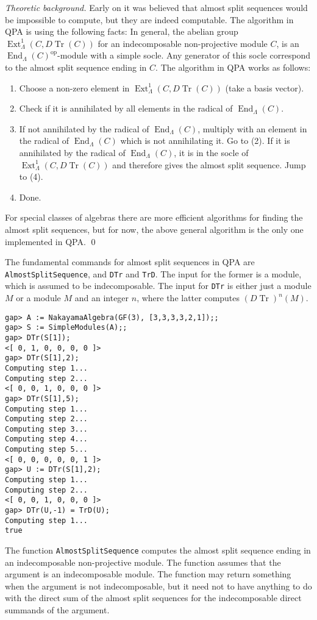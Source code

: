 \documentclass{amsart}
\newcommand{\End}{\operatorname{End}\nolimits}
\newcommand{\Tr}{\operatorname{Tr}\nolimits}
\newcommand{\Ext}{\operatorname{Ext}\nolimits}
\newcommand{\op}{{\operatorname{op}\nolimits}}
\theoremstyle{definition}
\newcommand{\code}[1]{\texttt{#1}}
\theoremstyle{theoretic}
\newenvironment{theoback}
{\medskip\small\textit{Theoretic background.} }
{\qed\par\medskip}
\begin{document}
\begin{theoback} 
Early on it was believed that almost split sequences would be
impossible to compute, but they are indeed computable.  The algorithm
in QPA is using the following facts:  In general, the abelian group
$\Ext^1_\Lambda(C,D\Tr(C))$ for an indecomposable non-projective
module $C$, is an $\End_\Lambda(C)^\op$-module with a simple socle.
Any generator of this socle correspond to the almost split sequence
ending in $C$.  The algorithm in QPA works as follows:  
\begin{enumerate}[\rm(1)]
\item Choose a non-zero element in $\Ext^1_\Lambda(C,D\Tr(C))$ (take a
  basis vector).
\item Check if it is annihilated by all elements in the radical of
  $\End_\Lambda(C)$. 
\item If not annihilated by the radical of $\End_\Lambda(C)$, multiply
  with an element in the radical of $\End_\Lambda(C)$ which is not
  annihilating it.  Go to (2).  If it is annihilated by the radical of
  $\End_\Lambda(C)$, it is in the socle of $\Ext^1_\Lambda(C,D\Tr(C))$
  and therefore gives the almost split sequence.  Jump to (4).
\item Done.
\end{enumerate}
For special classes of algebras there are more efficient algorithms
for finding the almost split sequences, but for now, the above general
algorithm is the only one implemented in QPA. 
\end{theoback} 

\sloppypar The fundamental commands for almost split sequences in QPA are
\code{AlmostSplitSequence}, and \code{DTr} and \code{TrD}.  The input
for the former is a module, which is assumed to be indecomposable.
The input for \code{DTr} is either just a module $M$ or a module $M$
and an integer $n$, where the latter computes $(D\Tr)^n(M)$.  
\begin{verbatim}
gap> A := NakayamaAlgebra(GF(3), [3,3,3,3,2,1]);;
gap> S := SimpleModules(A);;
gap> DTr(S[1]);
<[ 0, 1, 0, 0, 0, 0 ]>
gap> DTr(S[1],2);
Computing step 1...
Computing step 2...
<[ 0, 0, 1, 0, 0, 0 ]>
gap> DTr(S[1],5);
Computing step 1...
Computing step 2...
Computing step 3...
Computing step 4...
Computing step 5...
<[ 0, 0, 0, 0, 0, 1 ]>
gap> U := DTr(S[1],2);
Computing step 1...
Computing step 2...
<[ 0, 0, 1, 0, 0, 0 ]>
gap> DTr(U,-1) = TrD(U);   
Computing step 1...
true
\end{verbatim}
The function \code{AlmostSplitSequence} computes the almost split
sequence ending in an indecomposable non-projective module.  The 
function assumes that the argument is an indecomposable module.  The
function may return something when the argument is not indecomposable,
but it need not to have anything to do with the direct sum of the almost split
sequences for the indecomposable direct summands of the argument. 
\end{document}
